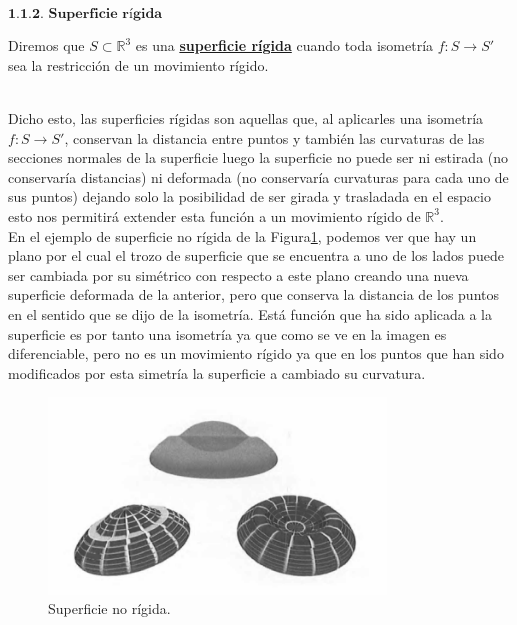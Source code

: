 ${ }$\\
$\textbf{1.1.2. Superficie rígida}$
${ }$\\

\begin{definicion}
	Diremos que $S \subset \mathbb{R}^3$ es una \underline{\textbf{superficie rígida}} cuando toda isometría $f : S \to S'$ sea la restricción de un movimiento rígido.
\end{definicion}
${ }$\\

Dicho esto, las superficies rígidas son aquellas que, al aplicarles una isometría $f : S \to S'$, conservan la distancia entre puntos y también las curvaturas de las secciones normales de la superficie luego la superficie no puede ser ni estirada (no conservaría distancias) ni deformada (no conservaría curvaturas para cada uno de sus puntos) dejando solo la posibilidad de ser girada y trasladada en el espacio esto nos permitirá extender esta función a un movimiento rígido de $\mathbb{R}^3$.
${ }$\\



En el ejemplo de superficie no rígida de la Figura\ref{fig:etiq_2}, podemos ver que hay un plano por el cual el trozo de superficie que se encuentra a uno de los lados puede ser cambiada por su simétrico con respecto a este plano creando una nueva superficie deformada de la anterior, pero que conserva la distancia de los puntos en el sentido que se dijo de la isometría. Está función que ha sido aplicada a la superficie es por tanto una isometría ya que como se ve en la imagen es diferenciable, pero no es un movimiento rígido ya que en los puntos que han sido modificados por esta simetría la superficie a cambiado su curvatura.
${ }$\\

\begin{figure}
	\begin{center}
		\includegraphics[width=0.8\textwidth]{imagenes/no_rigid}
	\end{center}
	\caption{Superficie no rígida.}
	\label{fig:etiq_2}
\end{figure}



